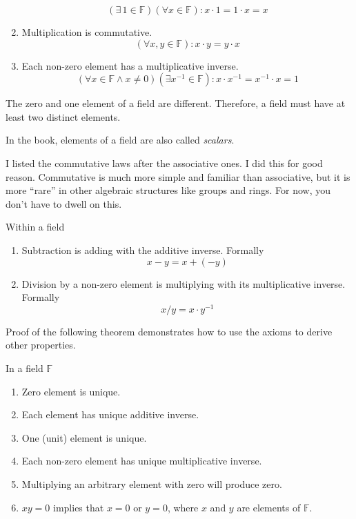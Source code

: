 \begin{definition}[Field]
\begin{enumerate}[label = (\arabic*)]
              \[
                  (\exists\,1\in\mathbb{F})(\forall x\in\mathbb{F}): x\cdot 1 = 1\cdot x = x
              \]
        \item Multiplication is commutative.\label{field:multiplication-commutative}
              \[
                  (\forall x, y\in\mathbb{F}): x\cdot y = y\cdot x
              \]
        \item Each non-zero element has a multiplicative inverse.\label{field:multiplicative-inverse}
              \[
                  (\forall x\in\mathbb{F} \wedge x\ne 0)(\exists x^{-1}\in\mathbb{F}): x\cdot x^{-1} = x^{-1}\cdot x = 1
              \]
    \end{enumerate}
\end{definition}

\begin{note}
    The zero and one element of a field are different. Therefore, a field must have at least two distinct elements.

    In the book, elements of a field are also called \textit{scalars}.

    I listed the commutative laws after the associative ones. I did this for good reason. Commutative is much more simple and familiar than associative, but it is more ``rare'' in other algebraic structures like groups and rings. For now, you don't have to dwell on this.
\end{note}

\begin{definition}
    Within a field
    \begin{enumerate}
        \item Subtraction is adding with the additive inverse. Formally
              \[
                  x - y = x + (-y)
              \]
        \item Division by a non-zero element is multiplying with its multiplicative inverse. Formally
              \[
                  x / y = x\cdot y^{-1}
              \]
    \end{enumerate}
\end{definition}

Proof of the following theorem demonstrates how to use the axioms to derive other properties.

\begin{theorem}\label{thm:field-properties}
    In a field $\mathbb{F}$
    \begin{enumerate}[label = (\roman*)]
        \item Zero element is unique.
        \item Each element has unique additive inverse.
        \item One (unit) element is unique.
        \item Each non-zero element has unique multiplicative inverse.
        \item Multiplying an arbitrary element with zero will produce zero.
        \item $xy = 0$ implies that $x = 0$ or $y = 0$, where $x$ and $y$ are elements of $\mathbb{F}$.
    \end{enumerate}
\end{theorem}

